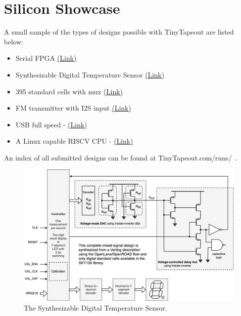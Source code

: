 \section{Silicon Showcase}
\label{sec:silicon_showcase}

A small sample of the types of designs possible with TinyTapeout are listed below:

\begin{itemize}
    \item Serial FPGA \href{https://tinytapeout.com/runs/tt02/006/}{(Link)}
    \item Synthesizable Digital Temperature Sensor \href{https://tinytapeout.com/runs/tt03/047/}{(Link)}
    \item 395 standard cells with mux \href{https://tinytapeout.com/runs/tt03/045/}{(Link)}
    \item FM transmitter with I2S input \href{https://tinytapeout.com/runs/tt04/195/}{(Link)}
    \item USB full speed - \href{https://tinytapeout.com/runs/tt04/054/}{(Link)}
    \item A Linux capable RISCV CPU - \href{https://tinytapeout.com/runs/tt05/654/}{(Link)}
\end{itemize}

An index of all submitted designs can be found at TinyTapeout.com/runs/~\cite{tinytapeoutruns}.

\begin{figure}[htp]
\centering
\includegraphics[width=\columnwidth]{./Figs/synthesized_temperature_sensor.png}
\caption{The Synthesizable Digital Temperature Sensor.}
\label{fig:synthesizable_digital_temperature_sensor}
\end{figure}
